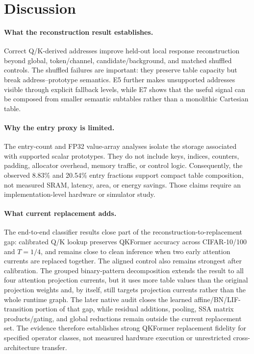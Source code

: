 \section{Discussion}
\label{sec:discussion}

\paragraph{What the reconstruction result establishes.}
Correct Q/K-derived addresses improve held-out local response reconstruction
beyond global, token/channel, candidate/background, and matched shuffled
controls. The shuffled failures are important: they preserve table capacity
but break address--prototype semantics. E5 further makes unsupported addresses
visible through explicit fallback levels, while E7 shows that the useful signal
can be composed from smaller semantic subtables rather than a monolithic
Cartesian table.

\paragraph{Why the entry proxy is limited.}
The entry-count and FP32 value-array analyses isolate the storage associated
with supported scalar prototypes. They do not include keys, indices, counters,
padding, allocator overhead, memory traffic, or control logic. Consequently,
the observed 8.83\% and 20.54\% entry fractions support compact table
composition, not measured SRAM, latency, area, or energy savings. Those claims
require an implementation-level hardware or simulator study.

\paragraph{What current replacement adds.}
The end-to-end classifier results close part of the
reconstruction-to-replacement gap: calibrated Q/K lookup preserves QKFormer
accuracy across CIFAR-10/100 and $T=1/4$, and remains close to clean inference
when two early attention currents are replaced together. The aligned control
also remains strongest after calibration. The grouped binary-pattern
decomposition extends the result to all four attention projection currents,
but it uses more table values than the original projection weights and, by
itself, still targets projection currents rather than the whole runtime graph.
The later native audit closes the learned affine/BN/LIF-transition portion of
that gap, while residual additions, pooling, SSA matrix products/gating, and
global reductions remain outside the current replacement set. The evidence
therefore establishes strong QKFormer replacement fidelity for specified
operator classes, not measured hardware execution or unrestricted
cross-architecture transfer.

